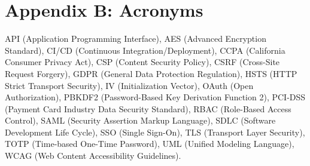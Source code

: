 \documentclass[12pt,a4paper]{article}
\begin{document}
\section*{Appendix B: Acronyms}

\begin{minipage}{\linewidth}
  \small\raggedright
  API (Application Programming Interface), AES (Advanced Encryption Standard), CI/CD (Continuous Integration/Deployment), CCPA (California Consumer Privacy Act), CSP (Content Security Policy), CSRF (Cross-Site Request Forgery), GDPR (General Data Protection Regulation), HSTS (HTTP Strict Transport Security), IV (Initialization Vector), OAuth (Open Authorization), PBKDF2 (Password-Based Key Derivation Function 2), PCI-DSS (Payment Card Industry Data Security Standard), RBAC (Role-Based Access Control), SAML (Security Assertion Markup Language), SDLC (Software Development Life Cycle), SSO (Single Sign-On), TLS (Transport Layer Security), TOTP (Time-based One-Time Password), UML (Unified Modeling Language), WCAG (Web Content Accessibility Guidelines).
\end{minipage}
\end{document}
